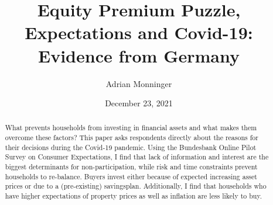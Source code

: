 \documentclass[ProjectABM]{subfiles}
\begin{document}
\providecommand{\versn}{pdf} %
\ifthenelse{\boolean{Web}}{    %
  \renewcommand{\versn}{Web}     %
  \renewcommand{\rootFromOut}{.} %
}{}  %


\title{Equity Premium Puzzle, Expectations and Covid-19:\\ Evidence from Germany}

\author{Adrian Monninger\authNum}




\renewcommand{\forcedate}{December 23, 2021}\date{\forcedate}

\maketitle
\hypertarget{abstract}{}
\begin{abstract}
What prevents households from investing in financial assets and what makes them overcome these factors? This paper asks respondents directly about the reasons for their decisions during the Covid-19 pandemic. Using the Bundesbank Online Pilot Survey on Consumer Expectations, I find that lack of information and interest are the biggest determinants for non-participation, while risk and time constraints prevent households to re-balance. Buyers invest either because of expected increasing asset prices or due to a (pre-existing) savingsplan. Additionally, I find that households who have higher expectations of property prices as well as inflation are less likely to buy.
\end{abstract}


\hypertarget{links}{}

\begin{authorsinfo}
\end{authorsinfo}
\end{document}
